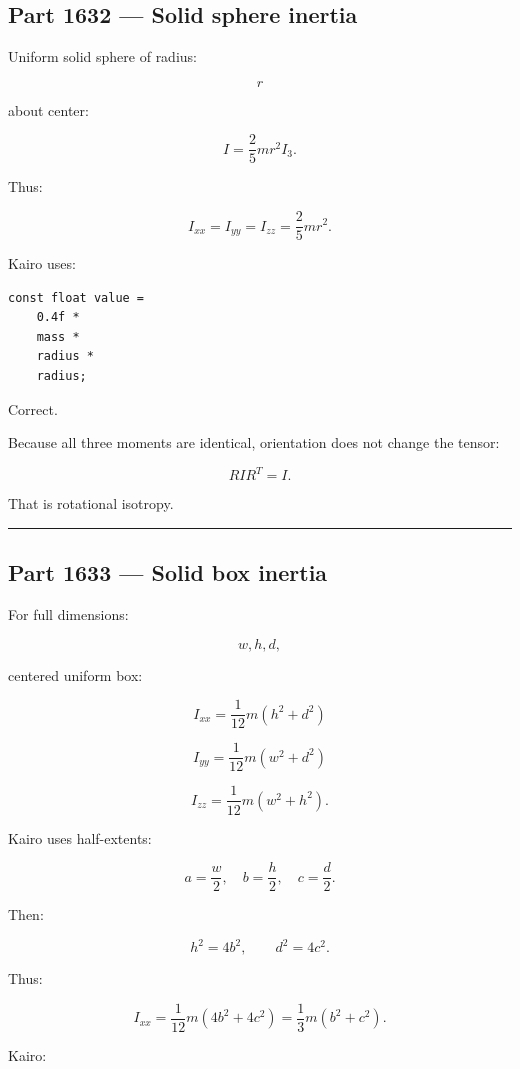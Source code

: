 \subsection{Part 1632 --- Solid sphere inertia}\label{06-engine-ii-ch035-part-1632-solid-sphere-inertia}

Uniform solid sphere of radius:

\[
r
\]

about center:

\[
\boxed{
I
=
\frac25mr^2I_3.
}
\]

Thus:

\[
I_{xx}
=
I_{yy}
=
I_{zz}
=
\frac25mr^2.
\]

Kairo uses:

\begin{verbatim}
const float value =
    0.4f *
    mass *
    radius *
    radius;
\end{verbatim}

Correct.

Because all three moments are identical, orientation does not change the tensor:

\[
RI R^T=I.
\]

That is rotational isotropy.

\begin{center}\rule{0.5\linewidth}{0.5pt}\end{center}

\subsection{Part 1633 --- Solid box inertia}\label{06-engine-ii-ch035-part-1633-solid-box-inertia}

For full dimensions:

\[
w,h,d,
\]

centered uniform box:

\[
I_{xx}
=
\frac{1}{12}m(h^2+d^2)
\]

\[
I_{yy}
=
\frac{1}{12}m(w^2+d^2)
\]

\[
I_{zz}
=
\frac{1}{12}m(w^2+h^2).
\]

Kairo uses half-extents:

\[
a=\frac w2,\quad
b=\frac h2,\quad
c=\frac d2.
\]

Then:

\[
h^2=4b^2,\qquad
d^2=4c^2.
\]

Thus:

\[
I_{xx}
=
\frac{1}{12}m(4b^2+4c^2)
=
\frac13m(b^2+c^2).
\]

Kairo:

